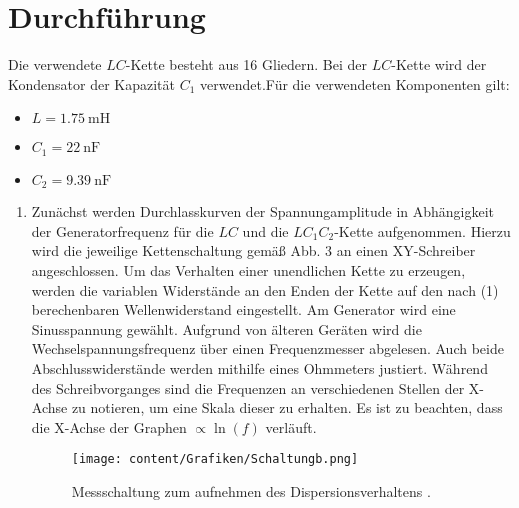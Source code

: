 
\section{Durchführung}
\label{sec:Durchführung}
\renewcommand{\labelenumi}{\alph{enumi})}
Die verwendete $LC$-Kette besteht aus 16 Gliedern. Bei der $LC$-Kette wird der
 Kondensator der Kapazität $C_1$ verwendet.Für die verwendeten Komponenten gilt:
\begin{itemize}
\item $L=\SI{1.75}{\milli\henry}$
\item $C_1=\SI{22}{\nano\farad}$
\item $C_2=\SI{9.39}{\nano\farad}$
\end{itemize}
\begin{enumerate}

  \begin{figure}[H]
    \centering
    \texttt{[image: content/Grafiken/Schaltunga.png]}
    \caption{Schaltung zum Aufzeichnen der Durchlasskurven \cite{V356}.}
    \label{fig:Schaltung1}
  \end{figure}

  \item Zunächst werden Durchlasskurven der Spannungamplitude in Abhängigkeit der Generatorfrequenz für die $LC$ und die $LC_1C_2$-Kette aufgenommen.
   Hierzu wird die jeweilige Kettenschaltung gemäß Abb. 3 an einen XY-Schreiber
   angeschlossen. Um das Verhalten einer unendlichen Kette zu erzeugen, werden die
   variablen Widerstände an den Enden der Kette auf den nach (1) berechenbaren
   Wellenwiderstand eingestellt. Am Generator wird eine Sinusspannung gewählt.
    Aufgrund von älteren Geräten wird die Wechselspannungsfrequenz über einen
     Frequenzmesser abgelesen. Auch beide Abschlusswiderstände werden mithilfe
      eines Ohmmeters justiert. Während des Schreibvorganges sind die Frequenzen
       an verschiedenen Stellen der X-Achse zu notieren, um eine Skala dieser zu erhalten.
        Es ist zu beachten, dass die X-Achse der
       Graphen $\propto \ln(f)$ verläuft.

       \begin{figure}[H]
         \centering
         \texttt{[image: content/Grafiken/Schaltungb.png]}
         \caption{Messschaltung zum aufnehmen des Dispersionsverhaltens \cite{V356}.}
         \label{fig:Schaltung2}
       \end{figure}


\end{enumerate}

